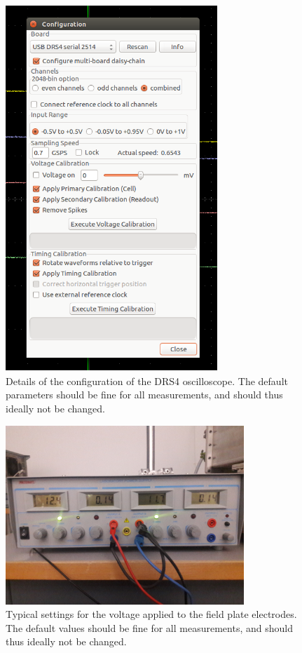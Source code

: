 \documentclass[12pt]{article}
\begin{document}
\begin{figure}[H]
    \centering
    \includegraphics[width = 8cm]{pics/DRS_oscilloscope_settings_configuration.png}
    \caption{\small Details of the configuration of the DRS4 oscilloscope. The default parameters should be fine for all measurements, and should thus ideally not be changed.}
    \label{fig:DRS_oscilloscope_settings_configuration}
\end{figure}
\begin{figure}[H]
    \centering
    \includegraphics[width = 9cm]{pics/field_plate_generator.jpg}
    \caption{\small Typical settings for the voltage applied to the field plate electrodes. The default values should be fine for all measurements, and should thus ideally not be changed.}
    \label{fig:field_plate_generator}
\end{figure}
\end{document}
